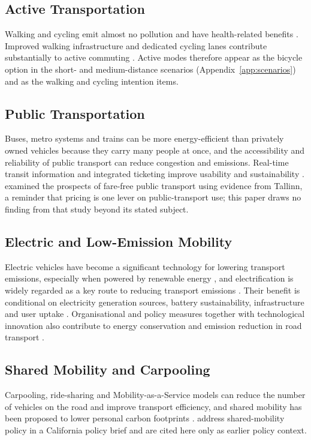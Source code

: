 \documentclass[11pt,a4paper]{article}
\begin{document}
\subsection{Active Transportation}
Walking and cycling emit almost no pollution and have health-related benefits \citep{lattman2024}.
Improved walking infrastructure and dedicated cycling lanes contribute substantially to active
commuting \citep{marzolla2025}. Active modes therefore appear as the bicycle option in the short- and
medium-distance scenarios (Appendix~\ref{app:scenarios}) and as the walking and cycling intention
items.

\subsection{Public Transportation}
Buses, metro systems and trains can be more energy-efficient than privately owned vehicles because
they carry many people at once, and the accessibility and reliability of public transport can reduce
congestion and emissions. Real-time transit information and integrated ticketing improve usability
and sustainability \citep{cui2024}. \citet{cats2017} examined the prospects of fare-free public
transport using evidence from Tallinn, a reminder that pricing is one lever on public-transport use;
this paper draws no finding from that study beyond its stated subject.

\subsection{Electric and Low-Emission Mobility}
Electric vehicles have become a significant technology for lowering transport emissions, especially
when powered by renewable energy \citep{liu2025}, and electrification is widely regarded as a key
route to reducing transport emissions \citep{mogire2025}. Their benefit is conditional on electricity
generation sources, battery sustainability, infrastructure and user uptake
\citep{ndhlovu2025,ouyang2025}. Organisational and policy measures together with technological
innovation also contribute to energy conservation and emission reduction in road transport
\citep{liu2025}.

\subsection{Shared Mobility and Carpooling}
Carpooling, ride-sharing and Mobility-as-a-Service models can reduce the number of vehicles on the
road and improve transport efficiency, and shared mobility has been proposed to lower personal carbon
footprints \citep{cui2024,garus2024}. \citet{shaheen2018} address shared-mobility policy in a
California policy brief and are cited here only as earlier policy context.
\end{document}
